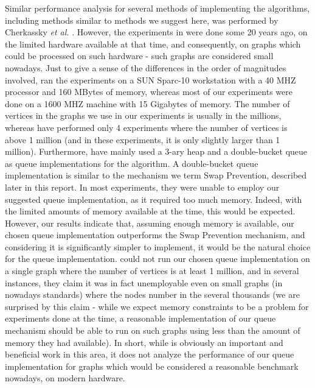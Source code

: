 \documentclass[conference,10pt,twocolumn]{IEEEtran}
\begin{document}
Similar performance analysis for several methods of implementing the algorithms, including methods similar to methods we suggest here, was performed by Cherkassky {\em et al.} \cite{cherkassky1996shortest}. However, the experiments in \cite{cherkassky1996shortest} were done some 20 years ago, on the limited hardware available at that time, and consequently, on graphs which could be processed on such hardware - such graphs are considered small nowadays. Just to give a sense of the differences in the order of magnitudes involved, \cite{cherkassky1996shortest} ran the experiments on a SUN Sparc-10 workstation with a 40 MHZ processor and 160 MBytes of memory, whereas most of our experiments were done on a 1600 MHZ machine with 15 Gigabytes of memory. The number of vertices in the graphs we use in our experiments is usually in the millions, whereas \cite{cherkassky1996shortest} have performed only 4 experiments where the number of vertices is above 1 million (and in these experiments, it is only slightly larger than 1 million).
Furthermore, \cite{cherkassky1996shortest} have mainly used a 3-ary heap and a double-bucket queue as queue implementations for the algorithm. A double-bucket queue implementation is similar to the mechanism we term Swap Prevention, described later in this report. In most experiments, they were unable to employ our suggested queue implementation, as it required too much memory. Indeed, with the limited amounts of memory available at the time, this would be expected. However, our results indicate that, assuming enough memory is available, our chosen queue implementation outperforms the Swap Prevention mechanism, and considering it is significantly simpler to implement, it would be the natural choice for the queue implementation. \cite{cherkassky1996shortest} could not run our chosen queue implementation on a single graph where the number of vertices is at least 1 million, and in several instances, they claim it was in fact unemployable even on small graphs (in nowadays standards) where the nodes number in the several thousands (we are surprised by this claim - while we expect memory constraints to be a problem for experiments done at the time, a reasonable implementation of our queue mechanism should be able to run on such graphs using less than the amount of memory they had available). In short, while \cite{cherkassky1996shortest} is obviously an important and beneficial work in this area, it does not analyze the performance of our queue implementation for graphs which would be considered a reasonable benchmark nowadays, on modern hardware.
\end{document}
